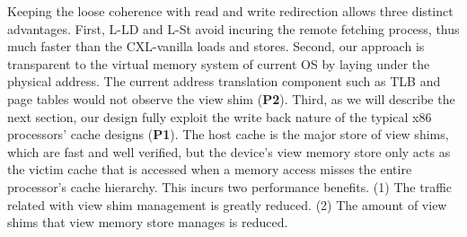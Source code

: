 \ifx\stale\undefined
Keeping the loose coherence with read and write redirection allows three distinct advantages.
First, L-LD and L-St avoid incuring the remote fetching process, thus much faster than the CXL-vanilla loads and stores. 
Second, our approach is transparent to the virtual memory system of current OS by laying under the physical address. The current address translation component such as TLB and page tables would not observe the view shim (\textbf{P2}). 
Third, as we will describe the next section, our design fully exploit the write back nature of the typical x86 processors' cache designs (\textbf{P1}). The host cache is the major store of view shims, which are fast and well verified, but the device's view memory store only acts as the victim cache that is accessed when a memory access misses the entire processor's cache hierarchy. This incurs two performance benefits. (1) The traffic related with view shim management is greatly reduced. (2) The amount of view shims that view memory store manages is reduced. 
\fi




